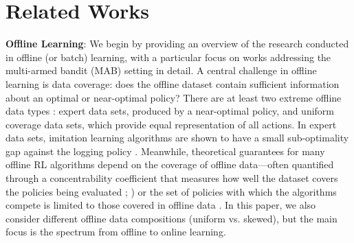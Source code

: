 \section{Related Works}

\textbf{Offline Learning}: We begin by providing an overview of the research conducted in offline (or batch) learning, with a particular focus on works addressing the multi-armed bandit (MAB) setting in detail. A central challenge in offline learning is data coverage: does the offline dataset contain sufficient information about an optimal or near-optimal policy? There are at least two extreme offline data types \citep{rashidinejad2023bridgingofflinereinforcementlearning}: expert data sets, produced by a near-optimal policy, and uniform coverage data sets, which provide equal representation of all actions. In expert data sets, imitation learning algorithms are shown to have a small sub-optimality gap against the logging policy \citep{Imitationlearningross,rajaraman2020fundamentallimitsimitationlearning}. Meanwhile, theoretical guarantees for many offline RL algorithms depend on the coverage of offline data—often quantified through a concentrability coefficient that measures how well the dataset covers the policies being evaluated \citep{rashidinejad2023bridgingofflinereinforcementlearning}; \cite{rashidinejad2023bridgingofflinereinforcementlearning}) or the set of policies with which the algorithms compete is limited to those covered in offline data \citep{cheng2022adversarially,  yin2020nearoptimalprovableuniformconvergence}. In this paper, we also consider different offline data compositions (uniform vs. skewed), but the main focus is the spectrum from offline to online learning.



